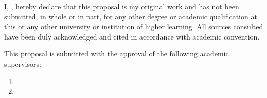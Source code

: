 
I, \candidatename, hereby declare that this proposal is my original work and has not been submitted, in whole or in part, for any other degree or academic qualification at this or any other university or institution of higher learning. All sources consulted have been duly acknowledged and cited in accordance with academic convention.

\vspace{1.2cm}
\signatureline

\vspace{1cm}
This proposal is submitted with the approval of the following academic supervisors:

\begin{enumerate}[leftmargin=2.2em,itemsep=18pt]
\item \begin{minipage}[t]{0.9\textwidth}
  \supervisorone

  \vspace{0.8cm}
  \signatureline
  \end{minipage}
\item \begin{minipage}[t]{0.9\textwidth}
  \supervisortwo

  \vspace{0.8cm}
  \signatureline
  \end{minipage}
\end{enumerate}
